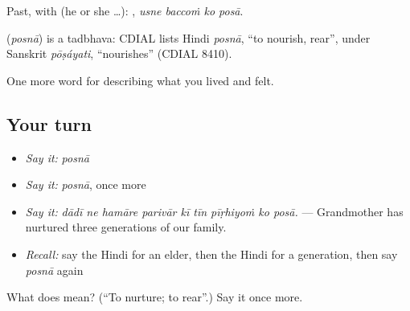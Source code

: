 Past, with  (he or she …):    , \emph{usne baccoṁ ko posā}.

\begin{cousinweb}
\textbf{} (\emph{posnā}) is a tadbhava: CDIAL lists Hindi \emph{posnā}, \textquotedblleft{}to nourish, rear\textquotedblright{}, under Sanskrit \emph{pōṣáyati}, \textquotedblleft{}nourishes\textquotedblright{} (CDIAL 8410).
\end{cousinweb}

\begin{grammarlens}[title={What you've built}]
One more word for describing what you lived and felt.
\end{grammarlens}

\subsection*{Your turn}
\begin{itemize}
\raggedright
  \item \emph{Say it:} \emph{posnā}
  \item \emph{Say it:} \emph{posnā}, once more
  \item \emph{Say it:} \emph{dādī ne hamāre parivār kī tīn pīṛhiyoṁ ko posā.} — Grandmother has nurtured three generations of our family.
  \item \emph{Recall:} say the Hindi for an elder, then the Hindi for a generation, then say \emph{posnā} again
\end{itemize}

\begin{tcolorbox}[breakable,colback=teal!4,colframe=teal!35!black,title={Before you move on}]
What does  mean? (\textquotedblleft{}To nurture; to rear\textquotedblright{}.) Say it once more.
\end{tcolorbox}
